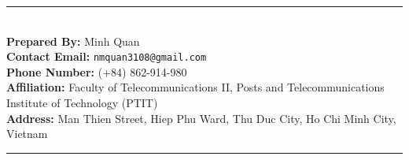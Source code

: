 \vspace{0.8cm}
\noindent
\begin{minipage}{\textwidth}
\setlength{\parindent}{0pt}
\rule{\linewidth}{0.6pt}\\[0.3cm]
\textbf{Prepared By:} Minh Quan \\
\textbf{Contact Email:} \texttt{nmquan3108@gmail.com} \\
\textbf{Phone Number:} (+84) 862-914-980 \\
\textbf{Affiliation:} Faculty of Telecommunications II, Posts and Telecommunications Institute of Technology (PTIT) \\
\textbf{Address:} Man Thien Street, Hiep Phu Ward, Thu Duc City, Ho Chi Minh City, Vietnam\\[0.2cm]
\rule{\linewidth}{0.6pt}
\end{minipage}
\vspace{0.5cm}
